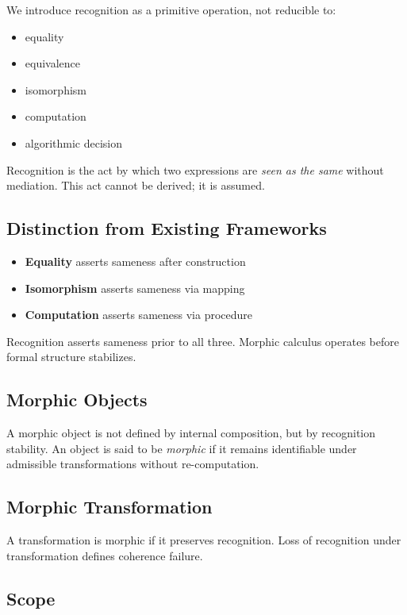 \documentclass[12pt, oneside]{article}
\begin{document}
We introduce recognition as a primitive operation, not reducible to:
\begin{itemize}
    \item equality
    \item equivalence
    \item isomorphism
    \item computation
    \item algorithmic decision
\end{itemize}

Recognition is the act by which two expressions are \emph{seen as the same} without mediation. This act cannot be derived; it is assumed.

\subsection{Distinction from Existing Frameworks}

\begin{itemize}
    \item \textbf{Equality} asserts sameness after construction
    \item \textbf{Isomorphism} asserts sameness via mapping
    \item \textbf{Computation} asserts sameness via procedure
\end{itemize}

Recognition asserts sameness prior to all three. Morphic calculus operates before formal structure stabilizes.

\subsection{Morphic Objects}

A morphic object is not defined by internal composition, but by recognition stability. An object is said to be \emph{morphic} if it remains identifiable under admissible transformations without re-computation.

\subsection{Morphic Transformation}

A transformation is morphic if it preserves recognition. Loss of recognition under transformation defines coherence failure.

\subsection{Scope}
\end{document}
